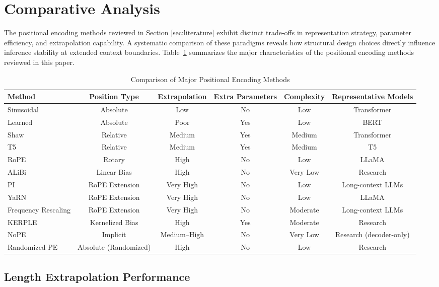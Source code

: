 \documentclass[conference]{IEEEtran}
\begin{document}
\section{Comparative Analysis}
\label{sec:comparison}

The positional encoding methods reviewed in Section \ref{sec:literature} exhibit distinct trade-offs in representation strategy, parameter efficiency, and extrapolation capability. A systematic comparison of these paradigms reveals how structural design choices directly influence inference stability at extended context boundaries. Table~\ref{tab:comparison} summarizes the major characteristics of the positional encoding methods reviewed in this paper.

\begin{table}[!t]
\caption{Comparison of Major Positional Encoding Methods}
\label{tab:comparison}
\centering
\begin{tabular}{lccccc}
\hline
\textbf{Method} & \textbf{Position Type} & \textbf{Extrapolation} & \textbf{Extra Parameters} & \textbf{Complexity} & \textbf{Representative Models} \\
\hline
Sinusoidal & Absolute & Low & No & Low & Transformer \\
Learned & Absolute & Poor & Yes & Low & BERT \\
Shaw & Relative & Medium & Yes & Medium & Transformer \\
T5 & Relative & Medium & Yes & Medium & T5 \\
RoPE & Rotary & High & No & Low & LLaMA \\
ALiBi & Linear Bias & High & No & Very Low & Research \\
PI & RoPE Extension & Very High & No & Low & Long-context LLMs \\
YaRN & RoPE Extension & Very High & No & Low & LLaMA \\
Frequency Rescaling & RoPE Extension & Very High & No & Moderate & Long-context LLMs \\
KERPLE & Kernelized Bias & High & Yes & Moderate & Research \\
NoPE & Implicit & Medium--High & No & Very Low & Research (decoder-only) \\
Randomized PE & Absolute (Randomized) & High & No & Low & Research \\
\hline
\end{tabular}
\end{table}

\subsection{Length Extrapolation Performance}
\end{document}

